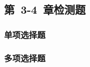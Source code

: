 \documentclass[color=purple,openany]{textbook-cn}
\begin{document}
\begin{Test}
\chapter{第~3-4~章检测题}

\begin{multicols}{2}

\vspace*{-1.0cm}

\subsection{单项选择题}

\begin{QsNum}
\item \lipsum[1][1]
\item \lipsum[1][1]
\item \lipsum[1][1]
\item \lipsum[1][1]
\item \lipsum[1][1]
\item \lipsum[1][1]
\item \lipsum[1][1]
\item \lipsum[1][1]
\item \lipsum[1][1]
\item \lipsum[1][1]
\item \lipsum[1][1]
\item \lipsum[1][1]
\item \lipsum[1][1]
\item \lipsum[1][1]
\item \lipsum[1][1]
\item \lipsum[1][1]
\item \lipsum[1][1]
\item \lipsum[1][1]
\item \lipsum[1][1]
\item \lipsum[1][1]
\end{QsNum}

\subsection{多项选择题}

\begin{QsNum}
\item \lipsum[1][1]
\item \lipsum[1][1]
\item \lipsum[1][1]
\item \lipsum[1][1]
\item \lipsum[1][1]
\item \lipsum[1][1]
\item \lipsum[1][1]
\item \lipsum[1][1]
\item \lipsum[1][1]
\item \lipsum[1][1]
\end{QsNum}


\end{multicols}
\end{Test}
\end{document}
